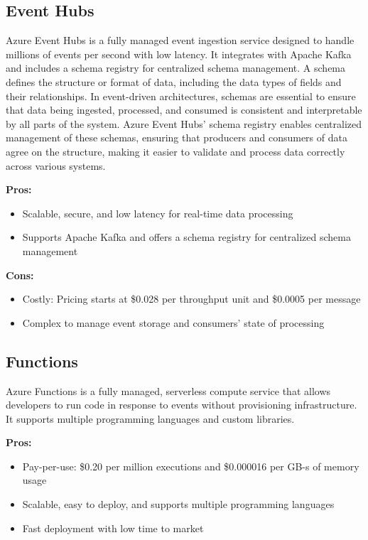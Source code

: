 \subsection*{Event Hubs}
\label{azure:event-hubs}
Azure Event Hubs is a fully managed event ingestion service designed to handle millions of events per second with low latency. It integrates with Apache Kafka and includes a schema registry for centralized schema management. A schema defines the structure or format of data, including the data types of fields and their relationships. In event-driven architectures, schemas are essential to ensure that data being ingested, processed, and consumed is consistent and interpretable by all parts of the system. Azure Event Hubs’ schema registry enables centralized management of these schemas, ensuring that producers and consumers of data agree on the structure, making it easier to validate and process data correctly across various systems.

\textbf{Pros:}
\begin{itemize}
    \item Scalable, secure, and low latency for real-time data processing
    \item Supports Apache Kafka and offers a schema registry for centralized schema management
\end{itemize}

\textbf{Cons:}
\begin{itemize}
    \item Costly: Pricing starts at \$0.028 per throughput unit and \$0.0005 per message
    \item Complex to manage event storage and consumers' state of processing
\end{itemize}

\subsection*{Functions}
\label{azure:functions}
Azure Functions is a fully managed, serverless compute service that allows developers to run code in response to events without provisioning infrastructure. It supports multiple programming languages and custom libraries.

\textbf{Pros:}
\begin{itemize}
    \item Pay-per-use: \$0.20 per million executions and \$0.000016 per GB-s of memory usage
    \item Scalable, easy to deploy, and supports multiple programming languages
    \item Fast deployment with low time to market
\end{itemize}

